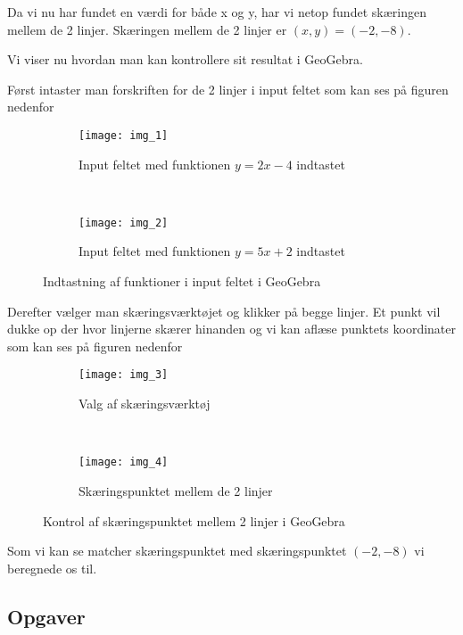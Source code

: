 Da vi nu har fundet en værdi for både x og y, har vi netop fundet skæringen mellem de 2 linjer. Skæringen mellem de 2 linjer er $(x,y) = (-2, -8)$.

Vi viser nu hvordan man kan kontrollere sit resultat i GeoGebra.

\newpage

Først intaster man forskriften for de 2 linjer i input feltet som kan ses på figuren nedenfor

\begin{figure*}[ht]
    \centering
    \begin{subfigure}[t]{0.5\textwidth}
        \centering
        \texttt{[image: img\_1]}
        \caption{Input feltet med funktionen $y = 2x-4$ indtastet}
    \end{subfigure}%
    ~ 
    \begin{subfigure}[t]{0.5\textwidth}
        \centering
        \texttt{[image: img\_2]}
        \caption{Input feltet med funktionen $y = 5x+2$ indtastet}
    \end{subfigure}
    \caption{Indtastning af funktioner i input feltet i GeoGebra}
\end{figure*}


Derefter vælger man skæringsværktøjet og klikker på begge linjer. Et punkt vil dukke op der hvor linjerne skærer hinanden og vi kan aflæse punktets koordinater som kan ses på figuren nedenfor

\begin{figure*}[ht]
    \centering
    \begin{subfigure}[t]{0.5\textwidth}
        \centering
        \texttt{[image: img\_3]}
        \caption{Valg af skæringsværktøj}
    \end{subfigure}%
    ~ 
    \begin{subfigure}[t]{0.5\textwidth}
        \centering
        \texttt{[image: img\_4]}
        \caption{Skæringspunktet mellem de 2 linjer}
    \end{subfigure}
    \caption{Kontrol af skæringspunktet mellem 2 linjer i GeoGebra}
\end{figure*}


Som vi kan se matcher skæringspunktet med skæringspunktet $(-2, -8)$ vi beregnede os til.








\subsection*{Opgaver}


